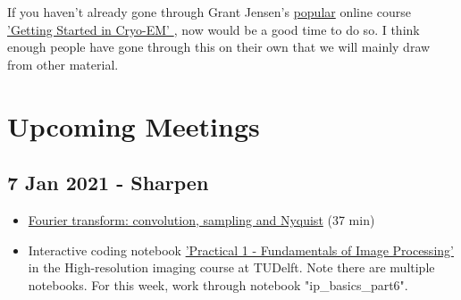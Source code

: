 \documentclass[11pt, oneside]{article}   	%
\begin{document}
If you haven't already gone through Grant Jensen's \href{https://www.caltech.edu/about/news/grant-jensen-cryo-em}{popular} online course \href{https://jensenlab.caltech.edu/courses/}{'Getting Started in Cryo-EM' }, now would be a good time to do so. I think enough people have gone through this on their own that we will mainly draw from other material. 

\pagebreak
\section{Upcoming Meetings}

\subsection{7 Jan 2021 - Sharpen}
\begin{itemize}
	\item \href{https://youtu.be/_F-YDwY9X30}{Fourier transform: convolution, sampling and Nyquist} (37 min)
	\item Interactive coding notebook \href{https://gitlab.tudelft.nl/aj-lab/teaching/-/wikis/NB4020}{'Practical 1 - Fundamentals of Image Processing'} in the High-resolution imaging course at TUDelft. Note there are multiple notebooks. For this week, work through notebook "ip\_basics\_part6".
\end{itemize}
\end{document}
